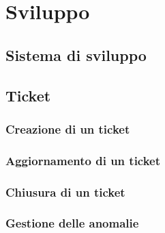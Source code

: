 \section{Sviluppo}
	\subsection{Sistema di sviluppo}
	\subsection{Ticket}
		\subsubsection{Creazione di un ticket}
		\subsubsection{Aggiornamento di un ticket}
		\subsubsection{Chiusura di un ticket}
		\subsubsection{Gestione delle anomalie}